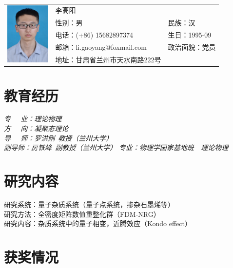 \documentclass{resume}
\begin{document}

\Large{
  \begin{tabu}{ c l l }
    &
   \scshape{李高阳} &  \\
    & 性别：男 & 民族：汉 \\
    & 电话：(+86) 15682897374 & 生日：1995-09 \\
    & 邮箱：li.gaoyang@foxmail.com & 政治面貌：党员\\
    & 地址：甘肃省兰州市天水南路222号 \hspace{40} & %
  \end{tabu}
}

\section{教育经历}
\textit{专$\quad\ \ $业：理论物理}\\
\textit{方$\quad\ \ $向：凝聚态理论}\\
\textit{导$\quad\ \ $师：罗洪刚\ 教授（兰州大学）}\\
\textit{副\hspace{7\ccwd}导\hspace{7\ccwd}师：房铁峰\ 副教授（兰州大学）}
\textit{专业：物理学国家基地班\ \ 理论物理}

\section{研究内容}
研究系统：量子杂质系统（量子点系统，掺杂石墨烯等）\\
研究方法：全密度矩阵数值重整化群（FDM-NRG）\\
研究内容：杂质系统中的量子相变，近腾效应（Kondo effect）\\

\section{获奖情况}
\end{document}
